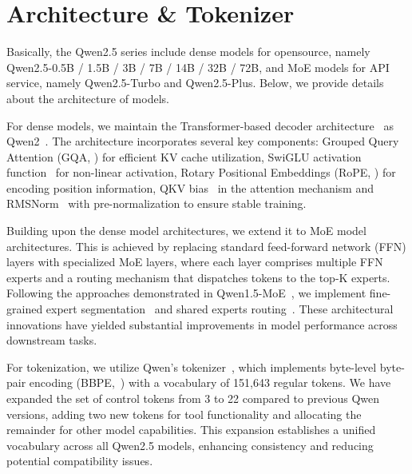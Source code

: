\section{Architecture \& Tokenizer}

Basically, the Qwen2.5 series include dense models for opensource, namely Qwen2.5-0.5B / 1.5B / 3B / 7B / 14B / 32B / 72B, and MoE models for API service, namely Qwen2.5-Turbo and Qwen2.5-Plus. Below, we provide details about the architecture of models.

For dense models, we maintain the Transformer-based decoder architecture~\citep{transformer,gpt} as Qwen2~\citep{qwen2}. The architecture incorporates several key components: Grouped Query Attention (GQA, \citealp{gqa}) for efficient KV cache utilization, SwiGLU activation function~\citep{glu} for non-linear activation, Rotary Positional Embeddings (RoPE, \citealp{rope}) for encoding position information, QKV bias~\citep{qkv_bias} in the attention mechanism and RMSNorm~\citep{rmsnorm} with pre-normalization to ensure stable training.

Building upon the dense model architectures, we extend it to MoE model architectures. This is achieved by replacing standard feed-forward network (FFN) layers with specialized MoE layers, where each layer comprises multiple FFN experts and a routing mechanism that dispatches tokens to the top-K experts. Following the approaches demonstrated in Qwen1.5-MoE~\citep{qwen2}, we implement fine-grained expert segmentation~\citep{deepseekmoe} and shared experts routing~\citep{deepspeedmoe, deepseekmoe}. These architectural innovations have yielded substantial improvements in model performance across downstream tasks.





For tokenization, we utilize Qwen's tokenizer~\citep{qwen}, which implements byte-level byte-pair encoding (BBPE,~\citealp{gpt3,wang2020neural,sennirch2016neural}) with a vocabulary of 151,643 regular tokens. We have expanded the set of control tokens from 3 to 22 compared to previous Qwen versions, adding two new tokens for tool functionality and allocating the remainder for other model capabilities. This expansion establishes a unified vocabulary across all Qwen2.5 models, enhancing consistency and reducing potential compatibility issues.

